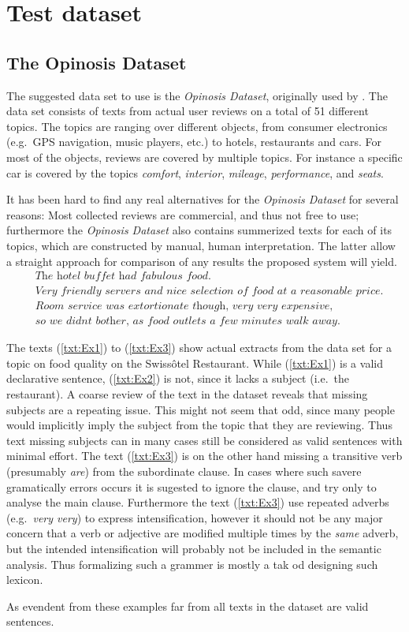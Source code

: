 \section{Test dataset}

\subsection{The Opinosis Dataset}
The suggested data set to use is the \emph{Opinosis Dataset}, originally used by \cite{Opinosis}. The data set consists of texts from actual user reviews on a total of 51 different topics. The topics are ranging over different objects, from consumer electronics (e.g.\ GPS navigation, music players, etc.) to hotels, restaurants and cars. For most of the objects, reviews are covered by multiple topics. For instance a specific car is covered by the topics \emph{comfort}, \emph{interior}, \emph{mileage}, \emph{performance}, and \emph{seats}.

It has been hard to find any real alternatives for the \emph{Opinosis Dataset} for several reasons: Most collected reviews are commercial, and thus not free to use; furthermore the \emph{Opinosis Dataset} also contains summerized texts for each of its topics, which are constructed by manual, human interpretation. The latter allow a straight approach for comparison of any results the proposed system will yield.\\
\begin{align}
  &\textit{The hotel buffet had fabulous food.}
  \label{txt:Ex1} \\[3mm]  
  &\textit{Very friendly servers and nice selection of food at a reasonable price.}
  \label{txt:Ex2} \\[3mm]  
  &\textit{Room service was extortionate though, very very expensive,} \nonumber \\
  &\textit{so we didnt bother, as food outlets a few minutes walk away.}
  \label{txt:Ex3}
\end{align}

The texts (\ref{txt:Ex1}) to (\ref{txt:Ex3}) show actual extracts from the data set for a topic on food quality on the Swissôtel Restaurant. While (\ref{txt:Ex1}) is a valid declarative sentence, (\ref{txt:Ex2}) is not, since it lacks a subject (i.e.\ the restaurant). A coarse review of the text in the dataset reveals that missing subjects are a repeating issue. This might not seem that odd, since many people would implicitly imply the subject from the topic that they are reviewing. Thus text missing subjects can in many cases still be considered as valid sentences with minimal effort. The text (\ref{txt:Ex3}) is on the other hand missing a transitive verb (presumably \emph{are}) from the subordinate clause. In cases where such savere gramatically errors occurs it is sugested to ignore the clause, and try only to analyse the main clause. Furthermore the text (\ref{txt:Ex3}) use repeated adverbs (e.g.\ \emph{very very}) to express intensification, however it should not be any major concern that a verb or adjective are modified multiple times by the \emph{same} adverb, but the intended intensification will probably not be included in the semantic analysis. Thus formalizing such a grammer is mostly a tak od designing such lexicon.

As evendent from these examples far from all texts in the dataset are valid sentences.

